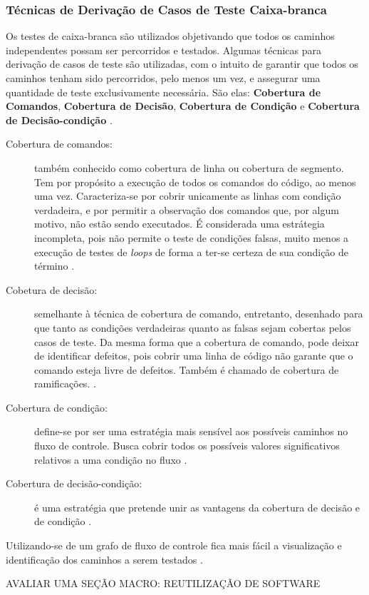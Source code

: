 \subsubsection{Técnicas de Derivação de Casos de Teste Caixa-branca}
Os testes de caixa-branca são utilizados objetivando que todos os caminhos independentes possam ser percorridos e testados. Algumas técnicas para derivação de casos de teste são utilizadas, com o intuito de garantir que todos os caminhos tenham sido percorridos, pelo menos um vez, e assegurar uma quantidade de teste exclusivamente necessária. São elas: \textbf{Cobertura de Comandos}, \textbf{Cobertura de Decisão}, \textbf{Cobertura de Condição} e \textbf{Cobertura de Decisão-condição} \cite{istqb2014}.

\begin{description}
\item[Cobertura de comandos:] também conhecido como cobertura de linha ou cobertura de segmento. Tem por propósito a execução de todos os comandos do código, ao menos uma vez. Caracteriza-se por cobrir unicamente as linhas com condição verdadeira, e por permitir a observação dos comandos que, por algum motivo, não estão sendo executados. É considerada uma estrátegia incompleta, pois não permite o teste de condições falsas, muito menos a execução de testes de \textit{loops} de forma a ter-se certeza de sua condição de término \cite{istqb2014}.
\item[Cobetura de decisão:] semelhante à técnica de cobertura de comando, entretanto, desenhado para que tanto as condições verdadeiras quanto as falsas sejam cobertas pelos casos de teste. Da mesma forma que a cobertura de comando, pode deixar de identificar defeitos, pois cobrir uma linha de código não garante que o comando esteja livre de defeitos. Também é chamado de cobertura de ramificações. \cite{istqb2014}.
\item[Cobertura de condição:] define-se por ser uma estratégia mais sensível aos possíveis caminhos no fluxo de controle. Busca cobrir todos os possíveis valores significativos relativos a uma condição no fluxo \cite{istqb2014}.
\item[Cobertura de decisão-condição:] é uma estratégia que pretende unir as vantagens da cobertura de decisão e de condição \cite{istqb2014}.
\end{description}
\par
\indent Utilizando-se de um grafo de fluxo de controle fica mais fácil a visualização e identificação dos caminhos a serem testados \cite{copeland2003}.
\par
\indent AVALIAR UMA SEÇÃO MACRO: REUTILIZAÇÃO DE SOFTWARE
